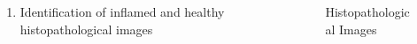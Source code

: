 \documentclass [9pt,times] {beamer}
\begin{document}
\begin{frame}
\begin{columns}
\begin{column}{7cm}
\begin{itemize}
\begin{enumerate}
			\item Identification of inflamed and healthy histopathological images %
			

			\end{enumerate}
	\end{itemize}
			
			
	\end{column}
\begin{column}{5cm}
	\begin{figure}[h!]
			\begin{center}
			
			\end{center}
		\caption{\fontsize{6pt}{8pt}\selectfont Histopathological Images \cite{ADLdataset}}
			
		\end{figure}
\end{column}
\end{columns}
\end{frame}
\end{document}
